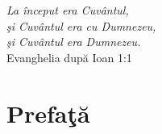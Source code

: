 
\begin{flushright}{\slshape  
       La început era Cuvântul, \\
       şi Cuvântul era cu Dumnezeu, \\
       şi Cuvântul era Dumnezeu.} \\ \medskip
    {Evanghelia după Ioan 1:1}
\end{flushright}

\bigskip

\begingroup
\let\clearpage\relax
\let\cleardoublepage\relax
\let\cleardoublepage\relax
\chapter*{Prefaţă}


 
\endgroup